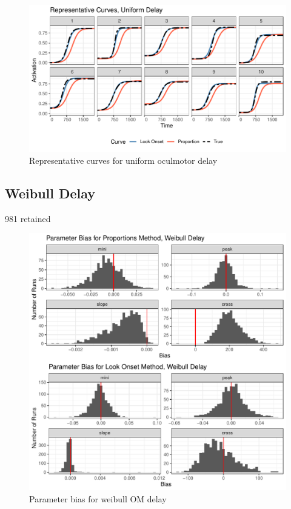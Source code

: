 \documentclass{article}
\begin{document}
\begin{figure}[H]
\centering
\includegraphics{rep_curves_uniform_delay.pdf}
\caption{Representative curves for uniform oculmotor delay}
\label{fig:rep_curves_uniform_delay}
\end{figure}


\subsection{Weibull Delay}

981 retained

\begin{figure}[H]
\centering
\includegraphics{weibull_delay_par_bias.pdf}
\caption{Parameter bias for weibull OM delay}
\label{fig:par_bias_weibull_delay}
\end{figure}
\end{document}

